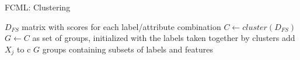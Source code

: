 		\begin{algorithm}
			\caption{FCML: Clustering} 
			\label{algo:fcml_clustering}
			\begin{algorithmic}
				\REQUIRE $ D_{FS} $ matrix with scores for each label/attribute combination
				\STATE $ C \gets cluster(D_{FS}) $ 
				\REQUIRE $ G \gets C$ as set of groups, initialized with the labels taken together by clusters
								\STATE add $ X_j $ to c
							\ENDIF
						\ENDFOR
					\ENDFOR
				\ENDFOR
				\RETURN $ G $ groups containing subsets of labels and features
			\end{algorithmic}
		\end{algorithm}